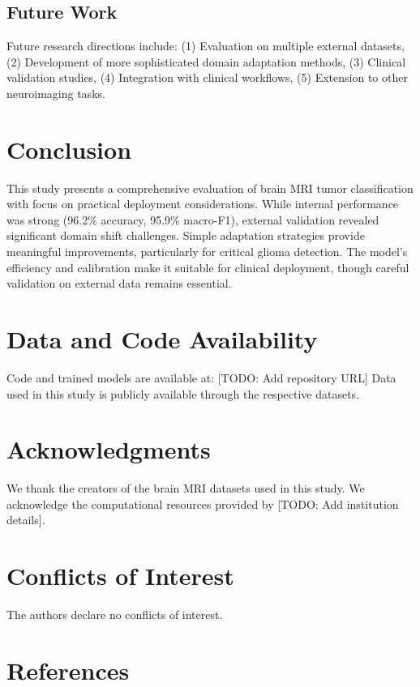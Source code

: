 \documentclass[11pt]{article}
\begin{document}
\subsection{Future Work}

Future research directions include: (1) Evaluation on multiple external datasets, (2) Development of more sophisticated domain adaptation methods, (3) Clinical validation studies, (4) Integration with clinical workflows, (5) Extension to other neuroimaging tasks.

\section{Conclusion}

This study presents a comprehensive evaluation of brain MRI tumor classification with focus on practical deployment considerations. While internal performance was strong (96.2\% accuracy, 95.9\% macro-F1), external validation revealed significant domain shift challenges. Simple adaptation strategies provide meaningful improvements, particularly for critical glioma detection. The model's efficiency and calibration make it suitable for clinical deployment, though careful validation on external data remains essential.

\section{Data and Code Availability}

Code and trained models are available at: [TODO: Add repository URL]
Data used in this study is publicly available through the respective datasets.

\section{Acknowledgments}

We thank the creators of the brain MRI datasets used in this study. We acknowledge the computational resources provided by [TODO: Add institution details].

\section{Conflicts of Interest}

The authors declare no conflicts of interest.

\section{References}
\end{document}
